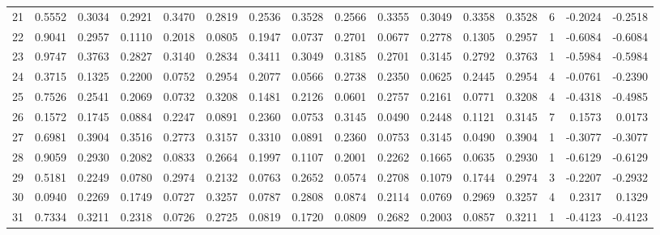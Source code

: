 \begin{tabular}{lrrrrrrrrrrrrrrr}
21  &      0.5552 &  0.3034 &  0.2921 &  0.3470 &  0.2819 &  0.2536 &  0.3528 &  0.2566 &  0.3355 &  0.3049 &   0.3358 &     0.3528 &      6 &                   -0.2024 &                    -0.2518 \\
22  &      0.9041 &  0.2957 &  0.1110 &  0.2018 &  0.0805 &  0.1947 &  0.0737 &  0.2701 &  0.0677 &  0.2778 &   0.1305 &     0.2957 &      1 &                   -0.6084 &                    -0.6084 \\
23  &      0.9747 &  0.3763 &  0.2827 &  0.3140 &  0.2834 &  0.3411 &  0.3049 &  0.3185 &  0.2701 &  0.3145 &   0.2792 &     0.3763 &      1 &                   -0.5984 &                    -0.5984 \\
24  &      0.3715 &  0.1325 &  0.2200 &  0.0752 &  0.2954 &  0.2077 &  0.0566 &  0.2738 &  0.2350 &  0.0625 &   0.2445 &     0.2954 &      4 &                   -0.0761 &                    -0.2390 \\
25  &      0.7526 &  0.2541 &  0.2069 &  0.0732 &  0.3208 &  0.1481 &  0.2126 &  0.0601 &  0.2757 &  0.2161 &   0.0771 &     0.3208 &      4 &                   -0.4318 &                    -0.4985 \\
26  &      0.1572 &  0.1745 &  0.0884 &  0.2247 &  0.0891 &  0.2360 &  0.0753 &  0.3145 &  0.0490 &  0.2448 &   0.1121 &     0.3145 &      7 &                    0.1573 &                     0.0173 \\
27  &      0.6981 &  0.3904 &  0.3516 &  0.2773 &  0.3157 &  0.3310 &  0.0891 &  0.2360 &  0.0753 &  0.3145 &   0.0490 &     0.3904 &      1 &                   -0.3077 &                    -0.3077 \\
28  &      0.9059 &  0.2930 &  0.2082 &  0.0833 &  0.2664 &  0.1997 &  0.1107 &  0.2001 &  0.2262 &  0.1665 &   0.0635 &     0.2930 &      1 &                   -0.6129 &                    -0.6129 \\
29  &      0.5181 &  0.2249 &  0.0780 &  0.2974 &  0.2132 &  0.0763 &  0.2652 &  0.0574 &  0.2708 &  0.1079 &   0.1744 &     0.2974 &      3 &                   -0.2207 &                    -0.2932 \\
30  &      0.0940 &  0.2269 &  0.1749 &  0.0727 &  0.3257 &  0.0787 &  0.2808 &  0.0874 &  0.2114 &  0.0769 &   0.2969 &     0.3257 &      4 &                    0.2317 &                     0.1329 \\
31  &      0.7334 &  0.3211 &  0.2318 &  0.0726 &  0.2725 &  0.0819 &  0.1720 &  0.0809 &  0.2682 &  0.2003 &   0.0857 &     0.3211 &      1 &                   -0.4123 &                    -0.4123 \\

\end{tabular}
